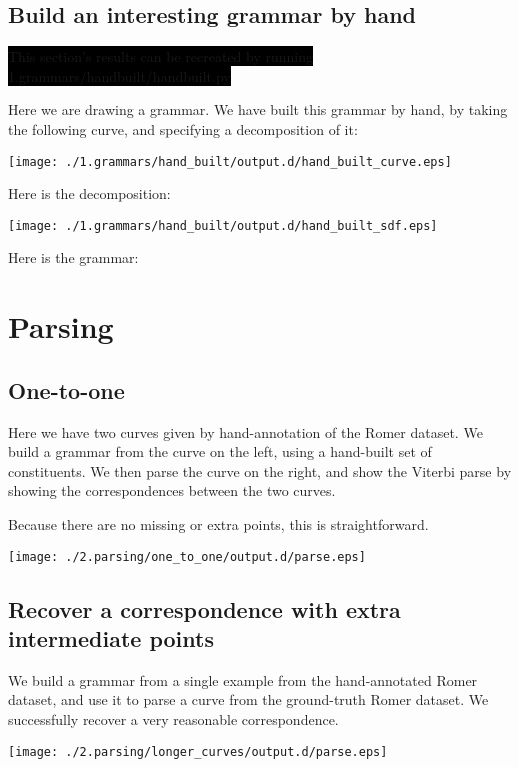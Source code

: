 \documentclass{book}
\newcommand{\bow}[1]{\colorbox{black}{\color{white} #1}}
\newcommand{\experiment}[1]{\bow{This section's results can be recreated by running #1}}
\begin{document}

\subsection{Build an interesting grammar by hand}
\label{sec-3_2_2}

\experiment{1.grammars/handbuilt/handbuilt.py}

Here we are drawing a grammar. We have built this grammar by hand, by
taking the following curve, and specifying a decomposition of it:

\texttt{[image: ./1.grammars/hand\_built/output.d/hand\_built\_curve.eps]}

Here is the decomposition:

\texttt{[image: ./1.grammars/hand\_built/output.d/hand\_built\_sdf.eps]}

Here is the grammar:


\section{Parsing}
\label{sec-3_3}
\subsection{One-to-one}
\label{sec-3_3_1}


Here we have two curves given by hand-annotation of the Romer
dataset. We build a grammar from the curve on the left, using a
hand-built set of constituents. We then parse the curve on the right,
and show the Viterbi parse by showing the correspondences between the
two curves.

Because there are no missing or extra points, this is straightforward.

\texttt{[image: ./2.parsing/one\_to\_one/output.d/parse.eps]}
\subsection{Recover a correspondence with extra intermediate points}
\label{sec-3_3_2}


We build a grammar from a single example from the hand-annotated Romer
dataset, and use it to parse a curve from the ground-truth Romer
dataset. We successfully recover a very reasonable correspondence.

\texttt{[image: ./2.parsing/longer\_curves/output.d/parse.eps]}
\end{document}
